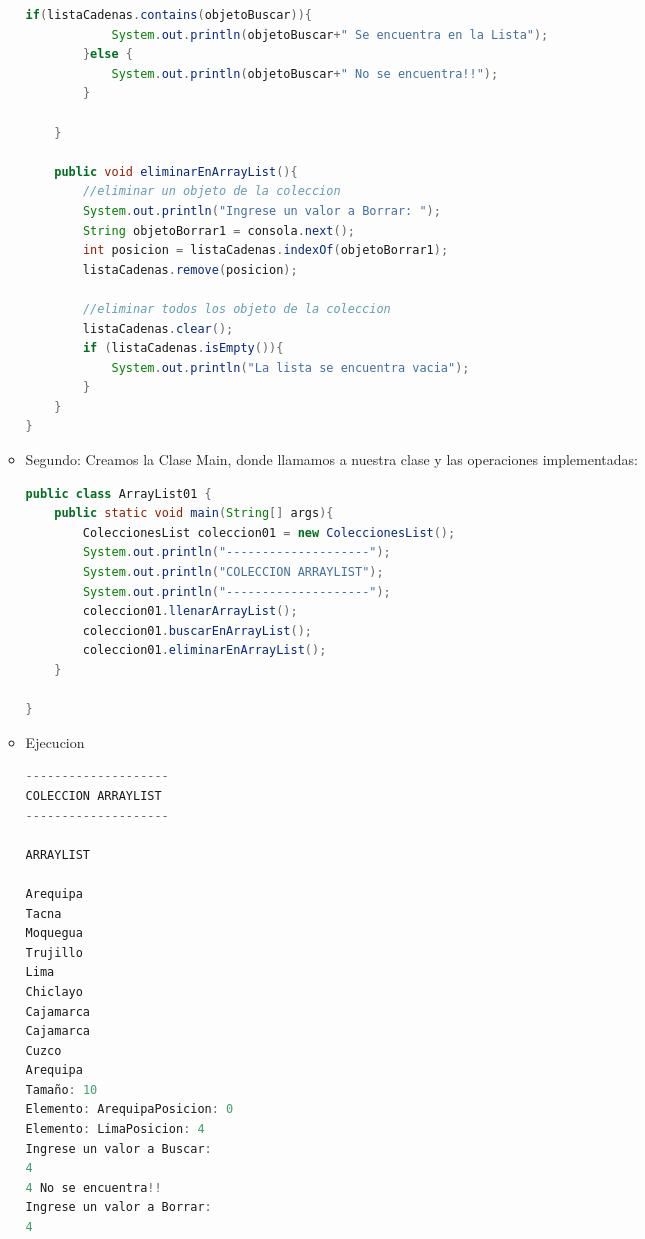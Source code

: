 \documentclass{article}
\begin{document}
\begin{itemize}
\begin{itemize}
\begin{lstlisting}[language=java]
        if(listaCadenas.contains(objetoBuscar)){
            System.out.println(objetoBuscar+" Se encuentra en la Lista");
        }else {
            System.out.println(objetoBuscar+" No se encuentra!!");
        }
        
    }

    public void eliminarEnArrayList(){
        //eliminar un objeto de la coleccion
        System.out.println("Ingrese un valor a Borrar: ");
        String objetoBorrar1 = consola.next();
        int posicion = listaCadenas.indexOf(objetoBorrar1);
        listaCadenas.remove(posicion);

        //eliminar todos los objeto de la coleccion
        listaCadenas.clear();
        if (listaCadenas.isEmpty()){
            System.out.println("La lista se encuentra vacia");
        }
    }
}
        \end{lstlisting}
		\item Segundo: Creamos la Clase Main, donde llamamos a nuestra clase y las operaciones implementadas:
        \begin{lstlisting}[language=java]
public class ArrayList01 {
    public static void main(String[] args){
        ColeccionesList coleccion01 = new ColeccionesList();
        System.out.println("--------------------");
        System.out.println("COLECCION ARRAYLIST");
        System.out.println("--------------------");
        coleccion01.llenarArrayList();
        coleccion01.buscarEnArrayList();
        coleccion01.eliminarEnArrayList();
    }
    
}
        \end{lstlisting}
        \item Ejecucion
        \begin{lstlisting}[language=java]
--------------------
COLECCION ARRAYLIST
--------------------

ARRAYLIST

Arequipa
Tacna
Moquegua
Trujillo
Lima
Chiclayo
Cajamarca
Cajamarca
Cuzco
Arequipa
Tamaño: 10
Elemento: ArequipaPosicion: 0
Elemento: LimaPosicion: 4
Ingrese un valor a Buscar:
4
4 No se encuentra!!
Ingrese un valor a Borrar:
4
        \end{lstlisting}


\end{itemize}
\end{itemize}
\end{document}
